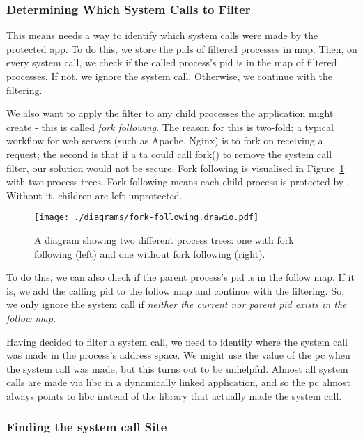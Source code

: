 \subsubsection{Determining Which System Calls to
Filter}\label{subsec:design-fork-following}

This means \af needs a way to identify which system calls were made by the
protected app. To do this, we store the \acp{pid} of filtered processes
in  map. Then, on every system call, we check if the
called process's \ac{pid} is in the map of filtered processes. If not, we ignore
the system call. Otherwise, we continue with the filtering.

We also want to apply the filter to any child processes the
application might create - this is called \textit{fork following}. The reason for this is two-fold: a typical workflow for
web servers (such as Apache, Nginx) \cite{apache-prefork-2.4, nginx-inside-performance-scale-2015} is to fork on receiving a request; the second is
that if a \ac{ta} could call fork() to remove the system call filter, our
solution would not be secure. Fork following is visualised in
Figure~\ref{fig:fork-follow-process-tree} with two process trees. Fork
following means each child process is protected by \af. Without it, children
are left unprotected.

\begin{figure}[ht]
    \centering
    \texttt{[image: ./diagrams/fork-following.drawio.pdf]} 
    \caption{A diagram showing two different process trees: one with fork
    following (left) and one without fork following (right).}
    \label{fig:fork-follow-process-tree}
\end{figure}


To do this, we can also check if the parent process's \ac{pid} is in the follow
map. If it is, we add the calling \ac{pid} to the follow map and continue with
the filtering. So, we only ignore the system call if \textit{neither the current nor
parent \ac{pid} exists in the follow map}.

Having decided to filter a system call, we need to identify where the system call was made in the process's
address space. We might use the value of the \ac{pc} when
the system call was made, but this turns out to be unhelpful.
Almost all system calls are made via \ac{libc} in a dynamically linked 
application, and so the \ac{pc} almost always points to \ac{libc} instead of the
library that actually made the system call.

\subsubsection{Finding the system call Site}\label{subsubsec:find_syscall}

